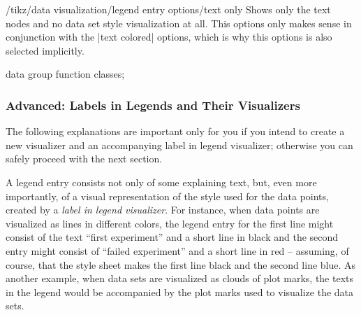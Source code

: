 \begin{key}{/tikz/data visualization/legend entry options/text only}
    Shows only the text nodes and no data set style visualization at all. This
    options only makes sense in conjunction with the |text colored| options,
    which is why this options is also selected implicitly.
\begin{codeexample}[
    width=8cm,
    preamble={\usetikzlibrary{datavisualization.formats.functions}},
    pre={\tikz \datavisualization data group {function classes} = {
  data [set=log, format=function] {
    var x : interval [0.2:2.5];
    func y = ln(\value x);
  }
  data [set=lin, format=function] {
    var x : interval [-2:2.5];
    func y = 0.5*\value x;
  }
  data [set=squared, format=function] {
    var x : interval [-1.5:1.5];
    func y = \value x*\value x;
  }
  data [set=exp, format=function] {
    var x : interval [-2.5:1];
    func y = exp(\value x);
  }
};},
]
\tikz \datavisualization [
  scientific axes,
  visualize as smooth line/.list=
    {log, lin, squared, exp},
  legend={south east inside, rows=2,
          label style=text only},
  log=    {label in legend={text=$\log x$}},
  lin=    {label in legend={text=$x/2$}},
  squared={label in legend={text=$x^2$}},
  exp=    {label in legend={text=$e^x$}},
  style sheet=strong colors]
data group {function classes};
\end{codeexample}
\end{key}


\subsubsection{Advanced: Labels in Legends and Their Visualizers}
\label{section-dv-legend-entries}

The following explanations are important only for you if you intend to create a
new visualizer and an accompanying label in legend visualizer; otherwise you
can safely proceed with the next section.

A legend entry consists not only of some explaining text, but, even more
importantly, of a visual representation of the style used for the data points,
created by a \emph{label in legend visualizer}. For instance, when data points
are visualized as lines in different colors, the legend entry for the first
line might consist of the text ``first experiment'' and a short line in black
and the second entry might consist of ``failed experiment'' and a short line in
red -- assuming, of course, that the style sheet makes the first line black and
the second line blue. As another example, when data sets are visualized as
clouds of plot marks, the texts in the legend would be accompanied by the plot
marks used to visualize the data sets.


